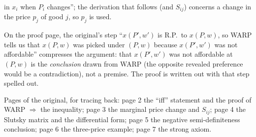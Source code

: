 \documentclass[11pt]{article}
\begin{document}
\begin{transcriptnotes}
        in $x_i$ when $P_i$ changes''; the derivation that follows (and $S_{ij}$)
        concerns a change in the price $p_j$ of good $j$, so $p_j$ is used.
  \item On the proof page, the original's step ``$x(P',w')$ is R.P.\ to $x(P,w)$, so
        WARP tells us that $x(P,w)$ was picked under $(P,w)$ because $x(P',w')$ was
        not affordable'' compresses the argument: that $x(P',w')$ was not affordable
        at $(P,w)$ is the \emph{conclusion} drawn from WARP (the opposite revealed
        preference would be a contradiction), not a premise. The proof is written out
        with that step spelled out.
  \item Pages of the original, for tracing back: page 2 the ``iff'' statement and the
        proof of WARP $\Rightarrow$ the inequality; page 3 the marginal price change
        and $S_{ij}$; page 4 the Slutsky matrix and the differential form; page 5 the
        negative semi-definiteness conclusion; page 6 the three-price example;
        page 7 the strong axiom.
\end{transcriptnotes}
\end{document}
